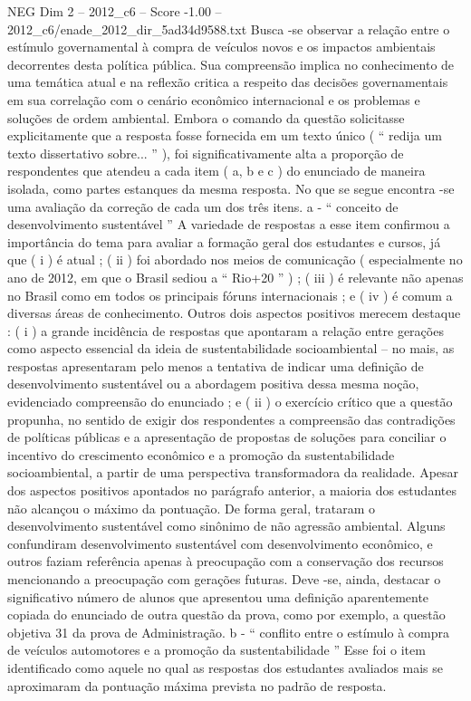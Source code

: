 \begin{textsample}{NEG Dim 2 – 2012\_c6 – Score -1.00 – 2012\_c6/enade\_2012\_dir\_5ad34d9588.txt}
Busca -se observar a relação entre o estímulo governamental à compra de veículos novos e os impactos ambientais decorrentes desta política pública.
Sua compreensão implica no conhecimento de uma temática atual e na reflexão critica a respeito das decisões governamentais em sua correlação com o cenário econômico internacional e os problemas e soluções de ordem ambiental.
Embora o comando da questão solicitasse explicitamente que a resposta fosse fornecida em um texto único ( “ redija um texto dissertativo sobre... ” ), foi significativamente alta a proporção de respondentes que atendeu a cada item ( a, b e c ) do enunciado de maneira isolada, como partes estanques da mesma resposta.
No que se segue encontra -se uma avaliação da correção de cada um dos três itens. a - “ conceito de desenvolvimento sustentável ” A variedade de respostas a esse item confirmou a importância do tema para avaliar a formação geral dos estudantes e cursos, já que ( i ) é atual ; ( ii ) foi abordado nos meios de comunicação ( especialmente no ano de 2012, em que o Brasil sediou a “ Rio+20 ” ) ; ( iii ) é relevante não apenas no Brasil como em todos os principais fóruns internacionais ; e ( iv ) é comum a diversas áreas de conhecimento.
Outros dois aspectos positivos merecem destaque : ( i ) a grande incidência de respostas que apontaram a relação entre gerações como aspecto essencial da ideia de sustentabilidade socioambiental – no mais, as respostas apresentaram pelo menos a tentativa de indicar uma definição de desenvolvimento sustentável ou a abordagem positiva dessa mesma noção, evidenciado compreensão do enunciado ; e ( ii ) o exercício crítico que a questão propunha, no sentido de exigir dos respondentes a compreensão das contradições de políticas públicas e a apresentação de propostas de soluções para conciliar o incentivo do crescimento econômico e a promoção da sustentabilidade socioambiental, a partir de uma perspectiva transformadora da realidade.
Apesar dos aspectos positivos apontados no parágrafo anterior, a maioria dos estudantes não alcançou o máximo da pontuação.
De forma geral, trataram o desenvolvimento sustentável como sinônimo de não agressão ambiental.
Alguns confundiram desenvolvimento sustentável com desenvolvimento econômico, e outros faziam referência apenas à preocupação com a conservação dos recursos mencionando a preocupação com gerações futuras.
Deve -se, ainda, destacar o significativo número de alunos que apresentou uma definição aparentemente copiada do enunciado de outra questão da prova, como por exemplo, a questão objetiva 31 da prova de Administração. b - “ conflito entre o estímulo à compra de veículos automotores e a promoção da sustentabilidade ” Esse foi o item identificado como aquele no qual as respostas dos estudantes avaliados mais se aproximaram da pontuação máxima prevista no padrão de resposta.

\end{textsample}
